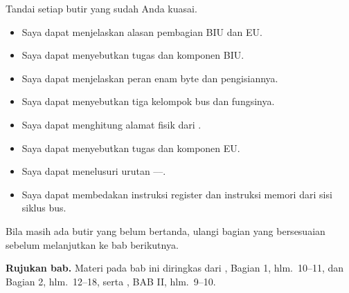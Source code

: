 \begin{checklistbox}
\vspace{1.1em}
Tandai setiap butir yang sudah Anda kuasai.

\begin{itemize}
    \item[\checkbox] Saya dapat menjelaskan alasan pembagian BIU dan
          EU.
    \item[\checkbox] Saya dapat menyebutkan tugas dan komponen BIU.
    \item[\checkbox] Saya dapat menjelaskan peran  enam
          byte dan pengisiannya.
    \item[\checkbox] Saya dapat menyebutkan tiga kelompok bus dan
          fungsinya.
    \item[\checkbox] Saya dapat menghitung alamat fisik dari
          .
    \item[\checkbox] Saya dapat menyebutkan tugas dan komponen EU.
    \item[\checkbox] Saya dapat menelusuri urutan
          ----.
    \item[\checkbox] Saya dapat membedakan instruksi register dan
          instruksi memori dari sisi siklus bus.
\end{itemize}

\vspace{0.4em}
Bila masih ada butir yang belum bertanda, ulangi bagian yang
bersesuaian sebelum melanjutkan ke bab berikutnya.
\end{checklistbox}

\begin{infobox}
\vspace{1.1em}
\textbf{Rujukan bab.} Materi pada bab ini diringkas dari
\cite{gunawan2019}, Bagian 1, hlm.~10--11, dan Bagian 2,
hlm.~12--18, serta \cite{sto2001}, BAB II, hlm.~9--10.
\end{infobox}

